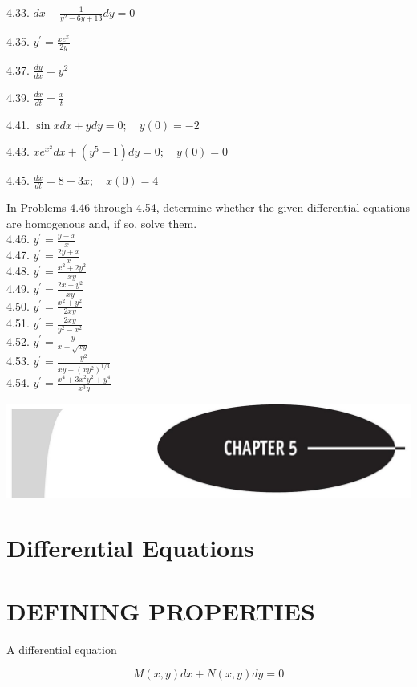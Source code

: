 \documentclass[10pt]{article}
\begin{document}
4.33. $d x-\frac{1}{y^{2}-6 y+13} d y=0$

4.35. $y^{\prime}=\frac{x e^{x}}{2 y}$

4.37. $\frac{d y}{d x}=y^{2}$

4.39. $\frac{d x}{d t}=\frac{x}{t}$

4.41. $\sin x d x+y d y=0 ; \quad y(0)=-2$

4.43. $x e^{x^{2}} d x+\left(y^{5}-1\right) d y=0 ; \quad y(0)=0$

4.45. $\frac{d x}{d t}=8-3 x ; \quad x(0)=4$

In Problems 4.46 through 4.54, determine whether the given differential equations are homogenous and, if so, solve them.\\
4.46. $y^{\prime}=\frac{y-x}{x}$\\
4.47. $y^{\prime}=\frac{2 y+x}{x}$\\
4.48. $y^{\prime}=\frac{x^{2}+2 y^{2}}{x y}$\\
4.49. $y^{\prime}=\frac{2 x+y^{2}}{x y}$\\
4.50. $y^{\prime}=\frac{x^{2}+y^{2}}{2 x y}$\\
4.51. $y^{\prime}=\frac{2 x y}{y^{2}-x^{2}}$\\
4.52. $y^{\prime}=\frac{y}{x+\sqrt{x y}}$\\
4.53. $y^{\prime}=\frac{y^{2}}{x y+\left(x y^{2}\right)^{1 / 3}}$\\
4.54. $y^{\prime}=\frac{x^{4}+3 x^{2} y^{2}+y^{4}}{x^{3} y}$

\begin{center}
\includegraphics[max width=\textwidth]{2024_04_03_5bb5b4275a64cb9887d1g-049}
\end{center}

\section*{Differential Equations}
\section*{DEFINING PROPERTIES}
A differential equation


\begin{equation*}
M(x, y) d x+N(x, y) d y=0 \tag{5.1}
\end{equation*}
\end{document}
